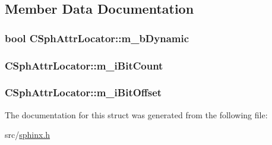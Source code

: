 \subsection{Member Data Documentation}
\hypertarget{structCSphAttrLocator_abc4ccbc4b218b9894c4efb8e1322ffde}{
\subsubsection[{m\-\_\-b\-Dynamic}]{\setlength{\rightskip}{0pt plus 5cm}bool C\-Sph\-Attr\-Locator\-::m\-\_\-b\-Dynamic}}\label{structCSphAttrLocator_abc4ccbc4b218b9894c4efb8e1322ffde}
\hypertarget{structCSphAttrLocator_abe3a432529b75f5ba09618479b751859}{
\subsubsection[{m\-\_\-i\-Bit\-Count}]{ C\-Sph\-Attr\-Locator\-::m\-\_\-i\-Bit\-Count}}\label{structCSphAttrLocator_abe3a432529b75f5ba09618479b751859}
\hypertarget{structCSphAttrLocator_a56a9976f793fe0d930a414c2c2af1e77}{
\subsubsection[{m\-\_\-i\-Bit\-Offset}]{ C\-Sph\-Attr\-Locator\-::m\-\_\-i\-Bit\-Offset}}\label{structCSphAttrLocator_a56a9976f793fe0d930a414c2c2af1e77}


The documentation for this struct was generated from the following file\-:\begin{DoxyCompactItemize}
\item 
src/\hyperlink{sphinx_8h}{sphinx.\-h}\end{DoxyCompactItemize}
